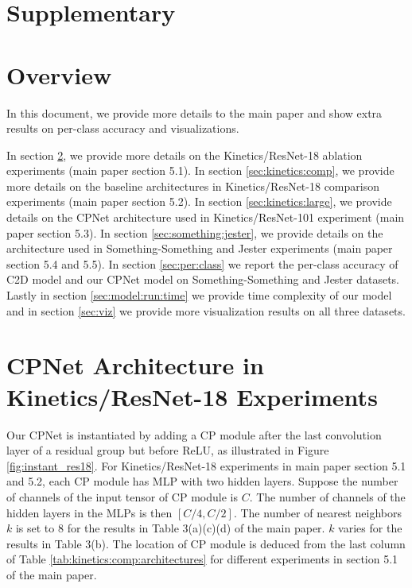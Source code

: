 \documentclass[10pt,twocolumn,letterpaper]{article}
\begin{document}
\newpage

{\small


}

 \section*{Supplementary}
\appendix



\section{Overview}

In this document, we provide more details to the main paper and show extra results on per-class accuracy and visualizations.

In section \ref{sec:kinetics:ablation}, we provide more details on the Kinetics/ResNet-18 ablation experiments (main paper section 5.1).
In section \ref{sec:kinetics:comp}, we provide more details on the baseline architectures in Kinetics/ResNet-18 comparison experiments (main paper section 5.2).
In section \ref{sec:kinetics:large}, we provide details on the CPNet architecture used  in Kinetics/ResNet-101 experiment (main paper section 5.3).
In section \ref{sec:something:jester}, we provide details on the architecture used  in Something-Something and Jester experiments (main paper section 5.4 and 5.5).
In section \ref{sec:per:class} we report the per-class accuracy of C2D model and our CPNet model on Something-Something and Jester datasets. Lastly in section \ref{sec:model:run:time} we provide time complexity of our model and in section \ref{sec:viz} we provide more visualization results on all three datasets.

\section{CPNet Architecture in  Kinetics/ResNet-18 Experiments}
\label{sec:kinetics:ablation}

Our CPNet is instantiated by adding a CP module after the last convolution layer of a residual group but before ReLU, as illustrated in Figure \ref{fig:instant_res18}. For Kinetics/ResNet-18 experiments in main paper section 5.1 and 5.2, each CP module has MLP with two hidden layers.
Suppose the number of channels of the input tensor of CP module is $C$. The number of channels of the hidden layers in the MLPs is then $[C/4, C/2]$. The number of nearest neighbors $k$ is set to 8 for the results in Table 3(a)(c)(d) of the main paper.  $k$ varies for the results in Table 3(b). The location of CP module is deduced from the last column of Table  \ref{tab:kinetics:comp:architectures} for different experiments in section 5.1 of the main paper.
\end{document}

